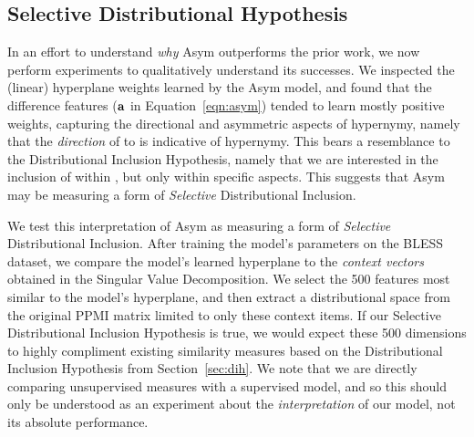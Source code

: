 \subsection{Selective Distributional Hypothesis}
\label{sec:selectivedih}

In an effort to understand {\em why} Asym outperforms the prior work, we
now perform experiments to qualitatively understand its successes. We
inspected the (linear) hyperplane weights learned by the Asym model,
and found that the difference features (${\mathbf{a}}$ in Equation~\ref{eqn:asym})
tended to learn mostly positive weights, capturing the directional and
asymmetric aspects of hypernymy, namely that the {\em direction} of 
to  is indicative of hypernymy. This bears a resemblance to the
Distributional Inclusion Hypothesis, namely that we are interested in the
inclusion of  within , but only within specific aspects.
This suggests that Asym may be measuring a form of {\em Selective}
Distributional Inclusion.

We test this interpretation of Asym as measuring a form of {\em Selective}
Distributional Inclusion. After training the model's parameters on the BLESS
dataset, we compare the model's learned hyperplane to the {\em context vectors}
obtained in the Singular Value Decomposition. We select the 500 features most
similar to the model's hyperplane, and then extract a distributional space from
the original PPMI matrix limited to only these context items.  If our Selective
Distributional Inclusion Hypothesis is true, we would expect these 500
dimensions to highly compliment existing similarity measures based on the
Distributional Inclusion Hypothesis from Section~\ref{sec:dih}. We note
that we are directly comparing unsupervised measures with a supervised model,
and so this should only be understood as an experiment about the {\em
interpretation} of our model, not its absolute performance.

